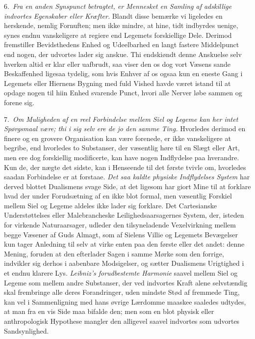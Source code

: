 \documentclass[12pt,a4paper]{article}
\newcommand{\opage}[1]{\marginnote{\footnotesize\textit{[#1]}}}
\begin{document}
\opage{15} 6.~\emph{Fra en anden Synspunct betragtet, er Mennesket en Samling af adskillige
indvortes Egenskaber eller Kræfter.} Blandt disse bemærke vi ligeledes en
herskende, nemlig Fornuften; men ikke mindre, at hine, tidt indbyrdes uenige,
synes endnu vanskeligere at regiere end Legemets forskiellige Dele. Derimod
fremstiller Bevidsthedens Enhed og Udeelbarhed en langt fastere Middelpunct end
nogen, der udvortes lader sig anskue. Thi endskiøndt denne Anskuelse selv hverken
altid er klar eller uafbrudt, saa viser den os dog vort Væsens sande Beskaffenhed
ligesaa tydelig, som hvis Enhver af os ogsaa kun en eneste Gang i Legemets eller
Hiernens Bygning med fuld Vished havde været istand til at opdage nogen til hiin
Enhed svarende Punct, hvori alle Nerver løbe sammen og forene sig.

7.~\emph{Om Muligheden af en reel Forbindelse mellem Siel og Legeme kan her intet
Spørgsmaal være; thi i sig selv ere de jo den samme Ting.} Hvorledes derimod en
finere og en grovere Organisation kan være forenede, er ikke vanskeligere at
begribe, end hvorledes to Substanser, der væsentlig høre til en Slægt eller Art,
men ere dog forskiellig modificerte, kan have nogen Indflydelse paa hverandre. Kun
de, der nægte det sidste, kan i Henseende til det første tvivle om, hvorledes
saadan Forbindelse er at forstaae. \emph{Det saa kaldte physiske Indflydelses
System} har derved blottet Dualismens svage Side, at det ligesom har giort Mine
til at
\opage{16} forklare hvad der under Forudsætning af en ikke blot formal, men
væsentlig Forskiel mellem Siel og Legeme aldeles ikke lader sig forklare. Det
Cartesianske Understøttelses eller Malebrancheske Leilighedsaarsagernes System,
der, isteden for virkende Naturaarsager, udleder den tilsyneladende
Vexelvirkning mellem begge Væsener af Guds Almagt, som af Sielens Villie og
Legemets Bevægelser kun tager Anledning til selv at virke enten paa den første
eller det andet: denne Mening, foruden at den efterlader Sagen i samme Mørke som
den forrige, indvikler sig derhos i aabenbare Modsigelser, og sætter Dualismens
Urigtighed i et endnu klarere Lys. \emph{Leibniz's forudbestemte Harmonie}
saavel mellem Siel og Legeme som mellem andre Substanser, der ved indvortes
Kraft alene selvstændig skal frembringe alle deres Forandringer, uden mindste
Stød af fremmede Ting, kan vel i Sammenligning med hans øvrige Lærdomme maaskee
saaledes udtydes, at man fra en vis Side maa bifalde den; men som en blot physisk
eller anthropologisk Hypothese mangler den alligevel saavel indvortes som
udvortes Sandsynlighed.
\end{document}

